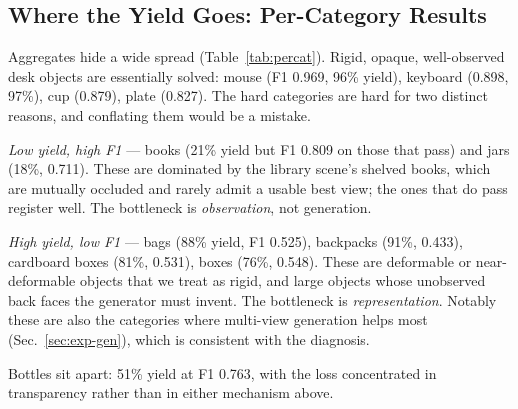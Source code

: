 \ifextended
\subsection{Where the Yield Goes: Per-Category Results}
\label{sec:exp-cat}
\begin{table}[t]
\caption{Per-category breakdown, GT-driven mode, all 50 scenes. Yield is
tier A+B; F1@20 is pooled over tier-A+B objects; \emph{stable} is the
corrected link-frame drop test.}
\label{tab:percat}
\centering\small

\end{table}

Aggregates hide a wide spread (Table~\ref{tab:percat}). Rigid, opaque,
well-observed desk objects are essentially solved: mouse (F1 0.969, 96\%
yield), keyboard (0.898, 97\%), cup (0.879), plate (0.827). The hard
categories are hard for two distinct reasons, and conflating them would be
a mistake.

\emph{Low yield, high F1} --- books (21\% yield but F1 0.809 on those that
pass) and jars (18\%, 0.711). These are dominated by the library scene's
shelved books, which are mutually occluded and rarely admit a usable
best view; the ones that do pass register well. The bottleneck is
\emph{observation}, not generation.

\emph{High yield, low F1} --- bags (88\% yield, F1 0.525), backpacks (91\%,
0.433), cardboard boxes (81\%, 0.531), boxes (76\%, 0.548). These are
deformable or near-deformable objects that we treat as rigid, and large
objects whose unobserved back faces the generator must invent. The
bottleneck is \emph{representation}. Notably these are also the
categories where multi-view generation helps most
(Sec.~\ref{sec:exp-gen}), which is consistent with the diagnosis.

Bottles sit apart: 51\% yield at F1 0.763, with the loss concentrated in
transparency rather than in either mechanism above.
\fi



